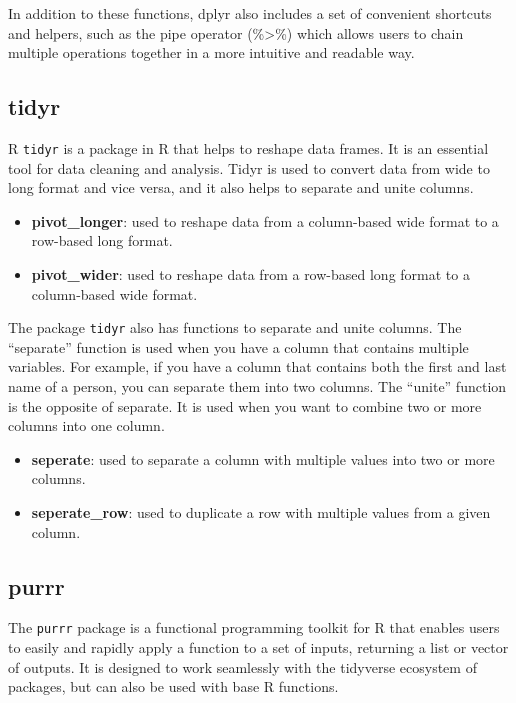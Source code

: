 \documentclass[
]{book}
\providecommand{\tightlist}{%
  \setlength{\itemsep}{0pt}\setlength{\parskip}{0pt}}
\begin{document}
In addition to these functions, dplyr also includes a set of convenient shortcuts and helpers, such as the pipe operator (\%\textgreater\%) which allows users to chain multiple operations together in a more intuitive and readable way.

\hypertarget{tidyr}{%
\subsection*{tidyr}\label{tidyr}}

R \texttt{tidyr} is a package in R that helps to reshape data frames. It is an essential tool for data cleaning and analysis. Tidyr is used to convert data from wide to long format and vice versa, and it also helps to separate and unite columns.

\begin{itemize}
\tightlist
\item
  \textbf{pivot\_longer}: used to reshape data from a column-based wide format to a row-based long format.
\item
  \textbf{pivot\_wider}: used to reshape data from a row-based long format to a column-based wide format.
\end{itemize}

The package \texttt{tidyr} also has functions to separate and unite columns. The ``separate'' function is used when you have a column that contains multiple variables. For example, if you have a column that contains both the first and last name of a person, you can separate them into two columns. The ``unite'' function is the opposite of separate. It is used when you want to combine two or more columns into one column.

\begin{itemize}
\tightlist
\item
  \textbf{seperate}: used to separate a column with multiple values into two or more columns.
\item
  \textbf{seperate\_row}: used to duplicate a row with multiple values from a given column.
\end{itemize}

\hypertarget{purrr}{%
\subsection*{purrr}\label{purrr}}

The \texttt{purrr} package is a functional programming toolkit for R that enables users to easily and rapidly apply a function to a set of inputs, returning a list or vector of outputs. It is designed to work seamlessly with the tidyverse ecosystem of packages, but can also be used with base R functions.
\end{document}
